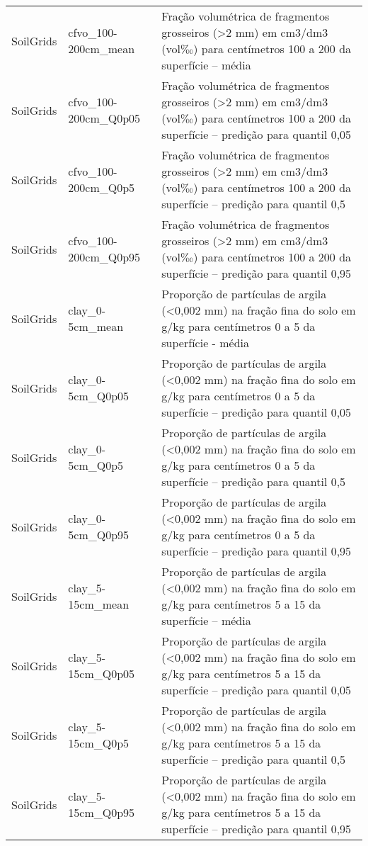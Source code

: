 \begin{longtable}{@{} p{4cm} p{4cm} p{8cm} @{}}
	SoilGrids &
	cfvo\_100-200cm\_mean &
	Fração volumétrica de fragmentos grosseiros (\textgreater 2 mm) em cm3/dm3 (vol‰) para centímetros 100 a 200 da superfície – média \\
	SoilGrids &
	cfvo\_100-200cm\_Q0p05 &
	Fração volumétrica de fragmentos grosseiros (\textgreater 2 mm) em cm3/dm3 (vol‰) para centímetros 100 a 200 da superfície – predição para quantil 0,05 \\
	SoilGrids &
	cfvo\_100-200cm\_Q0p5 &
	Fração volumétrica de fragmentos grosseiros (\textgreater 2 mm) em cm3/dm3 (vol‰) para centímetros 100 a 200 da superfície – predição para quantil 0,5 \\
	SoilGrids &
	cfvo\_100-200cm\_Q0p95 &
	Fração volumétrica de fragmentos grosseiros (\textgreater 2 mm) em cm3/dm3 (vol‰) para centímetros 100 a 200 da superfície – predição para quantil 0,95 \\
	SoilGrids &
	clay\_0-5cm\_mean &
	Proporção de partículas de argila (\textless 0,002 mm) na fração fina do solo em g/kg para centímetros 0 a 5 da superfície - média \\
	SoilGrids &
	clay\_0-5cm\_Q0p05 &
	Proporção de partículas de argila (\textless 0,002 mm) na fração fina do solo em g/kg para centímetros 0 a 5 da superfície – predição para quantil 0,05 \\
	SoilGrids &
	clay\_0-5cm\_Q0p5 &
	Proporção de partículas de argila (\textless 0,002 mm) na fração fina do solo em g/kg para centímetros 0 a 5 da superfície – predição para quantil 0,5 \\
	SoilGrids &
	clay\_0-5cm\_Q0p95 &
	Proporção de partículas de argila (\textless 0,002 mm) na fração fina do solo em g/kg para centímetros 0 a 5 da superfície – predição para quantil 0,95 \\
	SoilGrids &
	clay\_5-15cm\_mean &
	Proporção de partículas de argila (\textless 0,002 mm) na fração fina do solo em g/kg para centímetros 5 a 15 da superfície – média \\
	SoilGrids &
	clay\_5-15cm\_Q0p05 &
	Proporção de partículas de argila (\textless 0,002 mm) na fração fina do solo em g/kg para centímetros 5 a 15 da superfície – predição para quantil 0,05 \\
	SoilGrids &
	clay\_5-15cm\_Q0p5 &
	Proporção de partículas de argila (\textless 0,002 mm) na fração fina do solo em g/kg para centímetros 5 a 15 da superfície – predição para quantil 0,5 \\
	SoilGrids &
	clay\_5-15cm\_Q0p95 &
	Proporção de partículas de argila (\textless 0,002 mm) na fração fina do solo em g/kg para centímetros 5 a 15 da superfície – predição para quantil 0,95 \\

\end{longtable}
